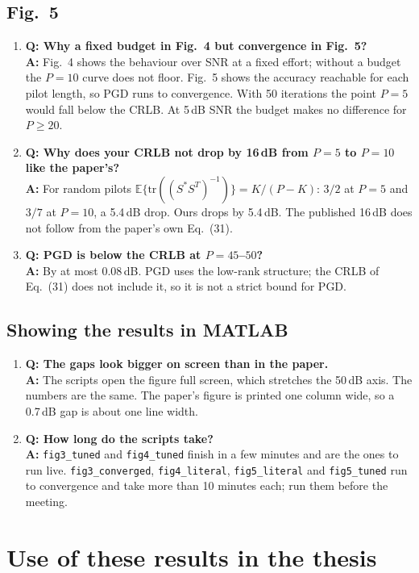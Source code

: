 \documentclass[11pt,a4paper]{article}
\newcommand{\file}[1]{\texttt{#1}}
\newcommand{\E}{\mathbb{E}}
\newcommand{\QA}[2]{\item \textbf{Q: #1}\\ \textbf{A:} #2}
\begin{document}
\subsection*{Fig.~5}
\begin{enumerate}[leftmargin=*,itemsep=4pt]
\QA{Why a fixed budget in Fig.~4 but convergence in Fig.~5?}
   {Fig.~4 shows the behaviour over SNR at a fixed effort; without a budget the $P=10$ curve does
    not floor. Fig.~5 shows the accuracy reachable for each pilot length, so PGD runs to
    convergence. With 50 iterations the point $P=5$ would fall below the CRLB. At 5\,dB SNR the
    budget makes no difference for $P\ge20$.}
\QA{Why does your CRLB not drop by 16\,dB from $P=5$ to $P=10$ like the paper's?}
   {For random pilots $\E\{\mathrm{tr}((S^*S^T)^{-1})\}=K/(P-K)$: $3/2$ at $P=5$ and $3/7$ at
    $P=10$, a 5.4\,dB drop. Ours drops by 5.4\,dB. The published 16\,dB does not follow from the
    paper's own Eq.~(31).}
\QA{PGD is below the CRLB at $P=45$--$50$?}
   {By at most 0.08\,dB. PGD uses the low-rank structure; the CRLB of Eq.~(31) does not include
    it, so it is not a strict bound for PGD.}
\end{enumerate}

\subsection*{Showing the results in MATLAB}
\begin{enumerate}[leftmargin=*,itemsep=4pt]
\QA{The gaps look bigger on screen than in the paper.}
   {The scripts open the figure full screen, which stretches the 50\,dB axis. The numbers are the
    same. The paper's figure is printed one column wide, so a 0.7\,dB gap is about one line width.}
\QA{How long do the scripts take?}
   {\file{fig3\_tuned} and \file{fig4\_tuned} finish in a few minutes and are the ones to run live.
    \file{fig3\_converged}, \file{fig4\_literal}, \file{fig5\_literal} and \file{fig5\_tuned} run to
    convergence and take more than 10 minutes each; run them before the meeting.}
\end{enumerate}

\section{Use of these results in the thesis}
\end{document}
